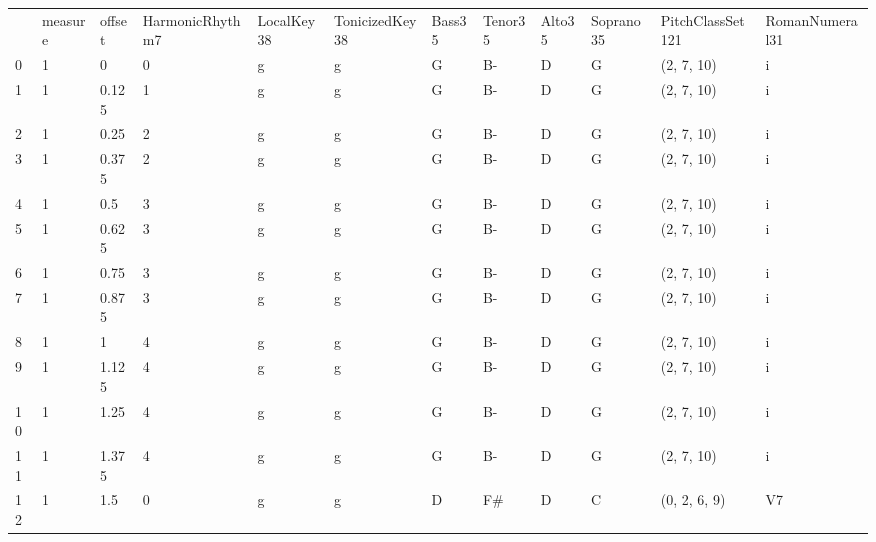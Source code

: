 \begin{tabular}{llllllllllll}
    & measure & offset & HarmonicRhythm7 & LocalKey38 & TonicizedKey38 & Bass35 & Tenor35 & Alto35 & Soprano35 & PitchClassSet121 & RomanNumeral31 \\
0   & 1       & 0      & 0               & g          & g              & G      & B-      & D      & G         & (2, 7, 10)       & i              \\
1   & 1       & 0.125  & 1               & g          & g              & G      & B-      & D      & G         & (2, 7, 10)       & i              \\
2   & 1       & 0.25   & 2               & g          & g              & G      & B-      & D      & G         & (2, 7, 10)       & i              \\
3   & 1       & 0.375  & 2               & g          & g              & G      & B-      & D      & G         & (2, 7, 10)       & i              \\
4   & 1       & 0.5    & 3               & g          & g              & G      & B-      & D      & G         & (2, 7, 10)       & i              \\
5   & 1       & 0.625  & 3               & g          & g              & G      & B-      & D      & G         & (2, 7, 10)       & i              \\
6   & 1       & 0.75   & 3               & g          & g              & G      & B-      & D      & G         & (2, 7, 10)       & i              \\
7   & 1       & 0.875  & 3               & g          & g              & G      & B-      & D      & G         & (2, 7, 10)       & i              \\
8   & 1       & 1      & 4               & g          & g              & G      & B-      & D      & G         & (2, 7, 10)       & i              \\
9   & 1       & 1.125  & 4               & g          & g              & G      & B-      & D      & G         & (2, 7, 10)       & i              \\
10  & 1       & 1.25   & 4               & g          & g              & G      & B-      & D      & G         & (2, 7, 10)       & i              \\
11  & 1       & 1.375  & 4               & g          & g              & G      & B-      & D      & G         & (2, 7, 10)       & i              \\
12  & 1       & 1.5    & 0               & g          & g              & D      & F#      & D      & C         & (0, 2, 6, 9)     & V7             \\

\end{tabular}
